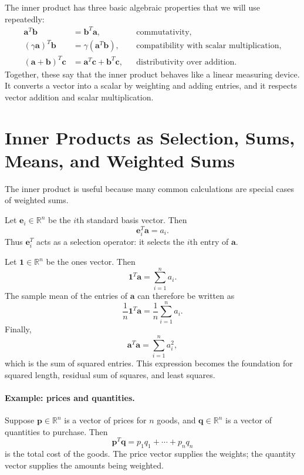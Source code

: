The inner product has three basic algebraic properties that we will use repeatedly:
\[
\begin{aligned}
    \mathbf{a}^T\mathbf{b} &= \mathbf{b}^T\mathbf{a}, &&\text{commutativity},\\
    (\gamma\mathbf{a})^T\mathbf{b} &= \gamma(\mathbf{a}^T\mathbf{b}), &&\text{compatibility with scalar multiplication},\\
    (\mathbf{a}+\mathbf{b})^T\mathbf{c} &= \mathbf{a}^T\mathbf{c}+\mathbf{b}^T\mathbf{c}, &&\text{distributivity over addition}.
\end{aligned}
\]
Together, these say that the inner product behaves like a linear measuring device. It converts a vector into a scalar by weighting and adding entries, and it respects vector addition and scalar multiplication.

\section{Inner Products as Selection, Sums, Means, and Weighted Sums}
\label{mf:inner-product-weighted-sums}
\label{mf:selection-operator}
\label{mf:ones-vector-sums-means}

The inner product is useful because many common calculations are special cases of weighted sums.

Let \(\mathbf{e}_i\in\mathbb{R}^n\) be the \(i\)th standard basis vector. Then
\[
    \mathbf{e}_i^T\mathbf{a}=a_i.
\]
Thus \(\mathbf{e}_i^T\) acts as a selection operator: it selects the \(i\)th entry of \(\mathbf{a}\).

Let \(\mathbf{1}\in\mathbb{R}^n\) be the ones vector. Then
\[
    \mathbf{1}^T\mathbf{a}=\sum_{i=1}^n a_i.
\]
The sample mean of the entries of \(\mathbf{a}\) can therefore be written as
\[
    \frac{1}{n}\mathbf{1}^T\mathbf{a}
    =\frac{1}{n}\sum_{i=1}^n a_i.
\]
Finally,
\[
    \mathbf{a}^T\mathbf{a}=\sum_{i=1}^n a_i^2,
\]
which is the sum of squared entries. This expression becomes the foundation for squared length, residual sum of squares, and least squares.

\paragraph{Example: prices and quantities.}
\label{mf:price-quantity-dot-product}
Suppose \(\mathbf{p}\in\mathbb{R}^n\) is a vector of prices for \(n\) goods, and \(\mathbf{q}\in\mathbb{R}^n\) is a vector of quantities to purchase. Then
\[
    \mathbf{p}^T\mathbf{q}
    =p_1q_1+\cdots+p_nq_n
\]
is the total cost of the goods. The price vector supplies the weights; the quantity vector supplies the amounts being weighted.

